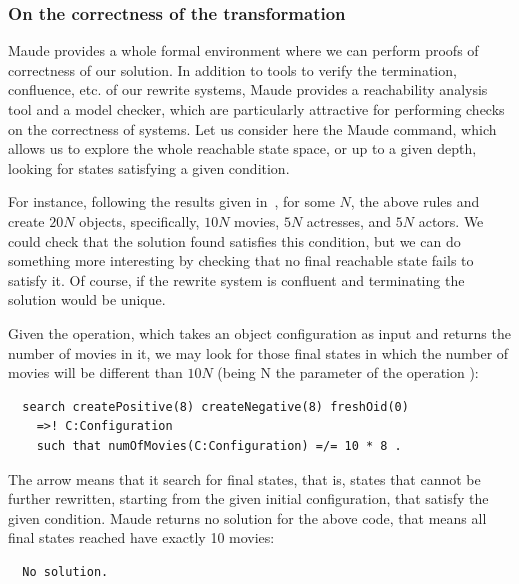 \subsubsection{On the correctness of the transformation}

Maude provides a whole formal environment where we can perform proofs of correctness of our solution. In addition to tools to verify the termination, confluence, etc. of our rewrite systems, Maude provides a reachability analysis tool and a model checker, which are particularly attractive for performing checks on the correctness of systems. Let us consider here the Maude  command, which allows us to explore the whole reachable state space, or up to a given depth, looking for states satisfying a given condition. 

For instance, following the results given in~\cite{imdbcase}, for some $N$, the above rules  and  create $20N$ objects, specifically, $10N$ movies, $5N$ actresses, and $5N$ actors. We could check that the solution found satisfies this condition, but we can do something more interesting by checking that no final reachable state fails to satisfy it. Of course, if the rewrite system is confluent and terminating the solution would be unique. 

Given the  operation, which takes an object configuration as input and returns the number of movies in it, we may look for those final states in which the number of movies will be different than $10N$ (being N the parameter of the operation ):
\begin{verbatim}
  search createPositive(8) createNegative(8) freshOid(0) 
    =>! C:Configuration
    such that numOfMovies(C:Configuration) =/= 10 * 8 .
\end{verbatim}

The arrow \code{=>!} means that it search for final states, that is, states that cannot be further rewritten, starting from the given initial configuration, that satisfy the given condition. Maude returns no solution for the above code, that means all final states reached have exactly 10 movies:
\begin{verbatim}
  No solution.
\end{verbatim}


